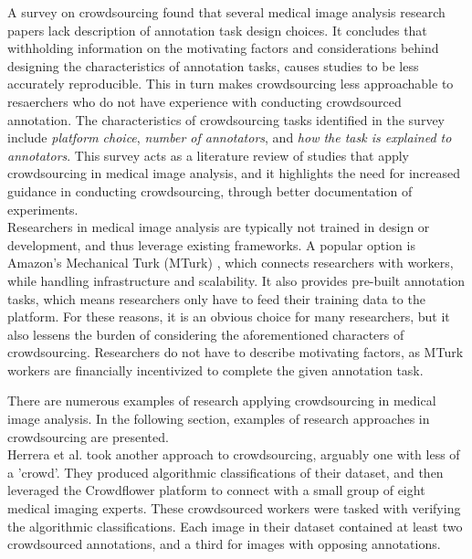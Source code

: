 \documentclass[../report.tex]{subfiles}
\begin{document}

A survey on crowdsourcing \cite{Oerting2019Survey} found that several medical image analysis research papers lack description of annotation task design choices. It concludes that withholding information on the motivating factors and considerations behind designing the characteristics of annotation tasks, causes studies to be less accurately reproducible. This in turn makes crowdsourcing less approachable to resaerchers who do not have experience with conducting crowdsourced annotation. The characteristics of crowdsourcing tasks identified in the survey include \textit{platform choice}, \textit{number of annotators}, and \textit{how the task is explained to annotators}. This survey acts as a literature review of studies that apply crowdsourcing in medical image analysis, and it highlights the need for increased guidance in conducting crowdsourcing, through better documentation of experiments. \\

Researchers in medical image analysis are typically not trained in design or development, and thus leverage existing frameworks. A popular option is Amazon's Mechanical Turk (MTurk) \cite{mturk}, which connects researchers with workers, while handling infrastructure and scalability. It also provides pre-built annotation tasks, which means researchers only have to feed their training data to the platform. For these reasons, it is an obvious choice for many researchers, but it also lessens the burden of considering the aforementioned characters of crowdsourcing. Researchers do not have to describe motivating factors, as MTurk workers are financially incentivized to complete the given annotation task.


There are numerous examples of research applying crowdsourcing in medical image analysis. In the following section, examples of research approaches in crowdsourcing are presented. \\

Herrera et al. \cite{herrera2014crowd} took another approach to crowdsourcing, arguably one with less of a 'crowd'. They produced algorithmic classifications of their dataset, and then leveraged the Crowdflower platform to connect with a small group of eight medical imaging experts. These crowdsourced workers were tasked with verifying the algorithmic classifications. Each image in their dataset contained at least two crowdsourced annotations, and a third for images with opposing annotations.
\end{document}
